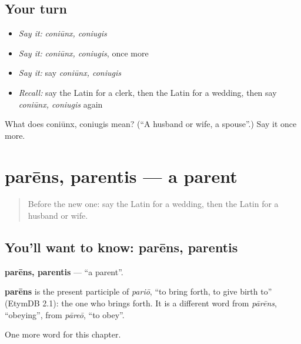 \subsection*{Your turn}
\begin{itemize}
\raggedright
  \item \emph{Say it:} \emph{coniūnx, coniugis}
  \item \emph{Say it:} \emph{coniūnx, coniugis}, once more
  \item \emph{Say it:} say \emph{coniūnx, coniugis}
  \item \emph{Recall:} say the Latin for a clerk, then the Latin for a wedding, then say \emph{coniūnx, coniugis} again
\end{itemize}

\begin{tcolorbox}[breakable,colback=teal!4,colframe=teal!35!black,title={Before you move on}]
What does coniūnx, coniugis mean? (\textquotedblleft{}A husband or wife, a spouse\textquotedblright{}.) Say it once more.
\end{tcolorbox}
\section[parēns, parentis]{parēns, parentis — a parent}

\label{lesson:LA-C273-parens}



\begin{quote}
Before the new one: say the Latin for a wedding, then the Latin for a husband or wife.
\end{quote}

\subsection*{You'll want to know: parēns, parentis}
\textbf{parēns, parentis} — \textquotedblleft{}a parent\textquotedblright{}.

\begin{cousinweb}
\textbf{parēns} is the present participle of \emph{pariō}, \textquotedblleft{}to bring forth, to give birth to\textquotedblright{} (EtymDB 2.1): the one who brings forth. It is a different word from \emph{pārēns}, \textquotedblleft{}obeying\textquotedblright{}, from \emph{pāreō}, \textquotedblleft{}to obey\textquotedblright{}.
\end{cousinweb}

\begin{grammarlens}[title={What you've built}]
One more word for this chapter.
\end{grammarlens}


